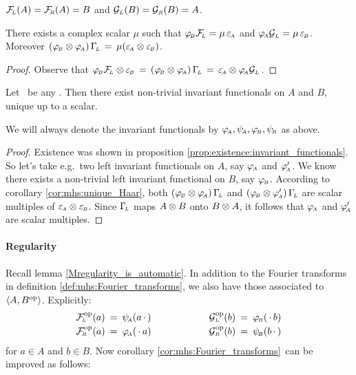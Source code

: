 \begin{cor_sec} \label{cor:mhs:Fourier_transforms}
$\FL(A) = \FR(A) = B$ and\/ $\GL(B) = \GR(B) = A$.
\end{cor_sec}


\begin{cor_sec}  \label{cor:mhs:unique_Haar}
There exists a complex scalar\/ $\mu$ such that\/ $\phiB \FL = \mu \, \epsA$
and\/ $\phiA \GL = \mu \, \epsB$.
Moreover\/ $(\phiB \tens \phiA)\, \GamL \,=\, \mu (\epsA \tens \epsB)$.
\end{cor_sec}


\begin{proof}
Observe that
$\phiB \FL \tens \epsB  \,=\,  (\phiB \tens \phiA)\, \GamL  \,=\,   \epsA \tens \phiA \GL$.
\end{proof}


\begin{thm_sec}  \label{prop:mhs:invariant_functionals:exist:unique}
Let\/ \pairAB\ be any \mhs\@.
Then there exist non-trivial invariant functionals on $A$ and\/ $B$,
unique up to a scalar.

\rm
We will always denote the invariant functionals by $\phiA, \psiA, \phiB, \psiB$ as above.
\end{thm_sec}

\begin{proof}
Existence was shown in proposition \ref{prop:existence:invariant_functionals}\@.
So let's take e.g.\ two left invariant functionals on $A$, say $\phiA$ and $\phiA'$.
We know there exists a non-trivial left invariant functional on $B$, say $\phiB$.
According to corollary \ref{cor:mhs:unique_Haar}, both $(\phiB \tens \phiA)\, \GamL$
and $(\phiB \tens \phiA')\, \GamL$ are scalar multiples of $\epsA \tens \epsB$.
Since $\GamL$ maps $A \tens B$ onto $B \tens A$, it follows that
$\phiA$ and $\phiA'$ are scalar multiples.
\end{proof}



\paragraph{Regularity}
Recall lemma \ref{Mregularity_is_automatic}\@.
In addition to the Fourier transforms in definition \ref{def:mhs:Fourier_transforms},
we also have those associated to $\pair{A}{B\op}$. Explicitly:
$$ \begin{array}{lll}
     \FL\op(a)  \:=\: \psiA(a\, \cdot \,)  & \hspace{4em}&
     \GL\op(b)  \:=\: \phiB(\, \cdot \,b) \\
     \FR\op(a)  \:=\: \phiA(\, \cdot \,a)   & \vertL &
     \GR\op(b)  \:=\: \psiB(b\, \cdot \,)
   \end{array} $$
for $a \in A$ and $b\in B$.
Now corollary \ref{cor:mhs:Fourier_transforms}\ can be improved as follows:


